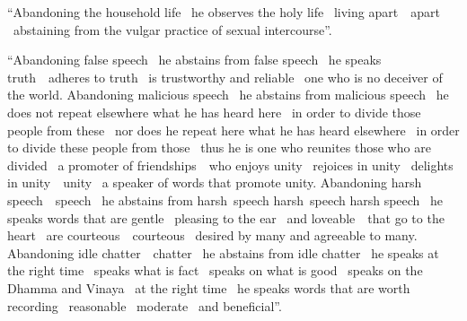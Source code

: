 \begin{english-only-justify}
  ``Abandoning the household life \breathmark\ he observes the holy life \breathmark\ living \ifbfiveversion \mbox{apart}~\breathmark\ \else apart \breathmark\ \fi  abstaining from the vulgar practice of sexual intercourse''.
\end{english-only-justify}

\begin{english-only-justify}
  ``Abandoning false speech \breathmark\ he abstains from false speech \breathmark\ he speaks \mbox{truth}~\breathmark\ adheres to truth \breathmark\ is trustworthy and reliable \breathmark\ one who is no deceiver of the world. Abandoning malicious speech \breathmark\ he abstains from malicious speech \breathmark\ he does not repeat elsewhere what he has heard here \breathmark\ in order to divide those people\makeatletter\hyperlink{endnote59-appendix}\makeatother
  from these \breathmark\ nor does he repeat here what he has heard elsewhere \breathmark\ in order to divide these people from those \breathmark\ thus he is one who reunites those who are divided \breathmark\ a promoter of \mbox{friendships}~\breathmark\ who enjoys unity \breathmark\ rejoices in unity \breathmark\ delights in \ifbfiveversion \mbox{unity}~\breathmark\ \else unity \breathmark\ \fi a speaker of words that promote unity. Abandoning harsh \ifbfiveversion \mbox{speech}~\breathmark\ \else speech \breathmark\ \fi he abstains from \ifafiveversion\mbox{harsh}~speech \fi \ifninebythirteenversion\mbox{harsh}~speech \fi \ifbfiveversion harsh speech \fi \breathmark\ he speaks words that are gentle \breathmark\ pleasing to the ear \breathmark\ and \mbox{loveable}~\breathmark\ that go to the heart \breathmark\ are \ifbfiveversion \mbox{courteous}~\breathmark\ \else courteous \breathmark\ \fi desired by many and agreeable to many. Abandoning idle \ifbfiveversion \mbox{chatter}~\breathmark\ \else chatter \breathmark\ \fi he abstains from idle chatter \breathmark\ he speaks at the right time \breathmark\ speaks what is fact \breathmark\ speaks on what is good \breathmark\ speaks on the Dhamma and Vinaya \breathmark\ at the right time \breathmark\ he speaks words that are worth recording \breathmark\ reasonable \breathmark\ moderate \breathmark\ and beneficial''.
\end{english-only-justify}

